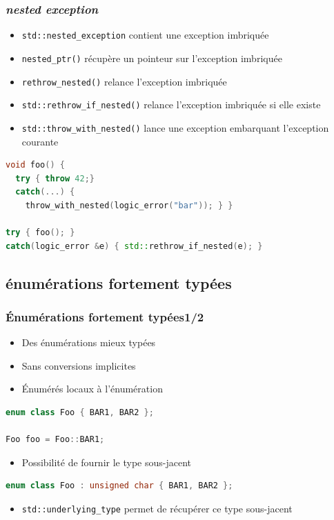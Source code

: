 \documentclass[C++.tex]{subfiles}
\begin{document}
\begin{frame}[fragile]
	\frametitle{\textit{nested exception}}
	\begin{itemize}
		\item \lstinline|std::nested_exception| contient une exception imbriquée
		\item \lstinline|nested_ptr()| récupère un pointeur sur l'exception imbriquée
		\item \lstinline|rethrow_nested()| relance l'exception imbriquée
		\item \lstinline|std::rethrow_if_nested()| relance l'exception imbriquée si elle existe
		\item \lstinline|std::throw_with_nested()| lance une exception embarquant l'exception courante
	\end{itemize}

	\begin{lstlisting}[language=C++]
void foo() {
  try { throw 42;}
  catch(...) { 
    throw_with_nested(logic_error("bar")); } }

try { foo(); }
catch(logic_error &e) { std::rethrow_if_nested(e); }\end{lstlisting}
\end{frame}

\subsection*{énumérations fortement typées}
\begin{frame}[fragile]
	\frametitle{Énumérations fortement typées\titlehfill{}1/2}
	\begin{itemize}
		\item Des énumérations mieux typées
		\item Sans conversions implicites


		\item Énumérés locaux à l'énumération
	\end{itemize}

	\begin{lstlisting}[language=C++]
enum class Foo { BAR1, BAR2 };

Foo foo = Foo::BAR1;\end{lstlisting}

	\begin{itemize}
		\item Possibilité de fournir le type sous-jacent
	\end{itemize}

	\begin{lstlisting}[language=C++]
enum class Foo : unsigned char { BAR1, BAR2 };\end{lstlisting}

	\begin{itemize}
		\item \lstinline|std::underlying_type| permet de récupérer ce type sous-jacent
	\end{itemize}
\end{frame}
\end{document}
